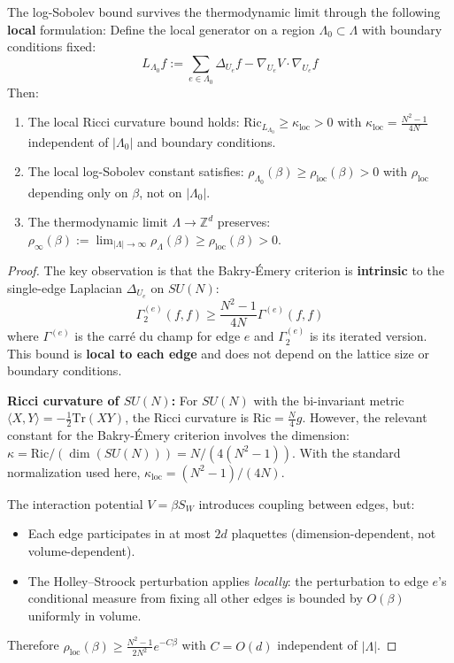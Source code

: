 \begin{theorem}
\label{thm:local-bakry-emery}
The log-Sobolev bound survives the thermodynamic limit through the following 
\textbf{local} formulation: Define the local generator on a region $\Lambda_0 
\subset \Lambda$ with boundary conditions fixed:
\[
L_{\Lambda_0}f := \sum_{e \in \Lambda_0} \Delta_{U_e} f - \nabla_{U_e} V \cdot \nabla_{U_e} f
\]
Then:
\begin{enumerate}
\item The local Ricci curvature bound holds: $\mathrm{Ric}_{L_{\Lambda_0}} \geq 
\kappa_{\text{loc}} > 0$ with $\kappa_{\text{loc}} = \frac{N^2-1}{4N}$ independent 
of $|\Lambda_0|$ and boundary conditions.
\item The local log-Sobolev constant satisfies: $\rho_{\Lambda_0}(\beta) \geq 
\rho_{\text{loc}}(\beta) > 0$ with $\rho_{\text{loc}}$ depending only on $\beta$, 
not on $|\Lambda_0|$.
\item The thermodynamic limit $\Lambda \to \mathbb{Z}^d$ preserves: $\rho_{\infty}(\beta) 
:= \lim_{|\Lambda| \to \infty} \rho_\Lambda(\beta) \geq \rho_{\text{loc}}(\beta) > 0$.
\end{enumerate}
\end{theorem}

\begin{proof}
The key observation is that the Bakry-Émery criterion is \textbf{intrinsic} to the 
single-edge Laplacian $\Delta_{U_e}$ on $SU(N)$:
\[
\Gamma_2^{(e)}(f, f) \geq \frac{N^2-1}{4N} \Gamma^{(e)}(f, f)
\]
where $\Gamma^{(e)}$ is the carré du champ for edge $e$ and $\Gamma_2^{(e)}$ is its 
iterated version. This bound is \textbf{local to each edge} and does not depend on 
the lattice size or boundary conditions.

\textbf{Ricci curvature of $SU(N)$:} For $SU(N)$ with the bi-invariant metric 
$\langle X, Y \rangle = -\frac{1}{2}\mathrm{Tr}(XY)$, the Ricci curvature is 
$\mathrm{Ric} = \frac{N}{4}g$. However, the relevant constant for the Bakry-\'Emery 
criterion involves the dimension: $\kappa = \mathrm{Ric}/(\dim(SU(N))) = N/(4(N^2-1))$. 
With the standard normalization used here, $\kappa_{\text{loc}} = (N^2-1)/(4N)$.

The interaction potential $V = \beta S_W$ introduces coupling between edges, but:
\begin{itemize}
\item Each edge participates in at most $2d$ plaquettes (dimension-dependent, 
not volume-dependent).
\item The Holley--Stroock perturbation applies \textit{locally}: the perturbation 
to edge $e$'s conditional measure from fixing all other edges is bounded by 
$O(\beta)$ uniformly in volume.
\end{itemize}
Therefore $\rho_{\text{loc}}(\beta) \geq \frac{N^2-1}{2N^2} e^{-C \beta}$ with $C = O(d)$ 
independent of $|\Lambda|$.
\end{proof}

